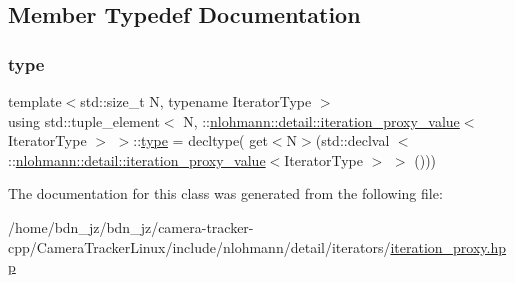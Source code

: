 \subsection{Member Typedef Documentation}
\mbox{\label{classstd_1_1tuple__element_3_01_n_00_01_1_1nlohmann_1_1detail_1_1iteration__proxy__value_3_01_iterator_type_01_4_01_4_ace1dfdb74841c2f58c064a50598188fd}} 
\subsubsection{\texorpdfstring{type}{type}}
{\footnotesize\ttfamily template$<$std\+::size\+\_\+t N, typename Iterator\+Type $>$ \\
using std\+::tuple\+\_\+element$<$ N, \+::\hyperlink{classnlohmann_1_1detail_1_1iteration__proxy__value}{nlohmann\+::detail\+::iteration\+\_\+proxy\+\_\+value}$<$ Iterator\+Type $>$ $>$\+::\hyperlink{classstd_1_1tuple__element_3_01_n_00_01_1_1nlohmann_1_1detail_1_1iteration__proxy__value_3_01_iterator_type_01_4_01_4_ace1dfdb74841c2f58c064a50598188fd}{type} =  decltype( get$<$N$>$(std\+::declval $<$ \+::\hyperlink{classnlohmann_1_1detail_1_1iteration__proxy__value}{nlohmann\+::detail\+::iteration\+\_\+proxy\+\_\+value}$<$Iterator\+Type $>$ $>$ ()))}



The documentation for this class was generated from the following file\+:\begin{DoxyCompactItemize}
\item 
/home/bdn\+\_\+jz/bdn\+\_\+jz/camera-\/tracker-\/cpp/\+Camera\+Tracker\+Linux/include/nlohmann/detail/iterators/\hyperlink{iteration__proxy_8hpp}{iteration\+\_\+proxy.\+hpp}\end{DoxyCompactItemize}
